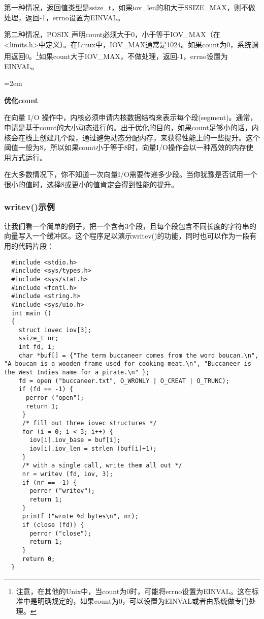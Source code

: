 第一种情况，返回值类型是ssize\_t，如果iov\_len的和大于SSIZE\_MAX，则不做处理，返回-1，errno设置为EINVAL。

第二种情况，POSIX 声明count必须大于0，小于等于IOV\_MAX（在\\<limits.h>中定义）。在Linux中，IOV\_MAX通常是1024。如果count为0，系统调用返回0。\footnote[2]{注意，在其他的Unix中，当count为0时，可能将errno设置为EINVAL。这在标准中是明确规定的，如果count为0，可以设置为EINVAL或者由系统做专门处理。}如果count大于IOV\_MAX，不做处理，返回-1，errno设置为\\EINVAL。

\begin{center}
\begin{boxedminipage}{\textwidth}
\parindent=2em
\begin{center}\textbf{优化count}\end{center}

在向量 I/O 操作中，内核必须申请内核数据结构来表示每个段(segment)。通常，申请是基于count的大小动态进行的。出于优化的目的，如果count足够小的话，内核会在栈上创建几个段，通过避免动态分配内存，来获得性能上的一些提升。这个阈值一般为8，所以如果count小于等于8时，向量I/O操作会以一种高效的内存使用方式运行。

在大多数情况下，你不知道一次向量I/O需要传递多少段。当你犹豫是否试用一个很小的值时，选择8或更小的值肯定会得到性能的提升。
\end{boxedminipage}
\end{center}

\subsubsection{writev()示例}

让我们看一个简单的例子，把一个含有3个段，且每个段包含不同长度的字符串的向量写入一个缓冲区。这个程序足以演示writev()的功能，同时也可以作为一段有用的代码片段：

\begin{lstlisting}
  #include <stdio.h>
  #include <sys/types.h>
  #include <sys/stat.h>
  #include <fcntl.h>
  #include <string.h>
  #include <sys/uio.h>
  int main ()
  {
    struct iovec iov[3];
    ssize_t nr;
    int fd, i;
    char *buf[] = {"The term buccaneer comes from the word boucan.\n", "A boucan is a wooden frame used for cooking meat.\n", "Buccaneer is the West Indies name for a pirate.\n" };
    fd = open ("buccaneer.txt", O_WRONLY | O_CREAT | O_TRUNC);
    if (fd == -1) {
      perror ("open");
      return 1;
     }
     /* fill out three iovec structures */
     for (i = 0; i < 3; i++) {
       iov[i].iov_base = buf[i];
       iov[i].iov_len = strlen (buf[i]+1);
     }
     /* with a single call, write them all out */
     nr = writev (fd, iov, 3);
     if (nr == -1) {
       perror ("writev");
       return 1;
     }
     printf ("wrote %d bytes\n", nr);
     if (close (fd)) {
       perror ("close");
       return 1;
     }
     return 0;
  }
\end{lstlisting}

